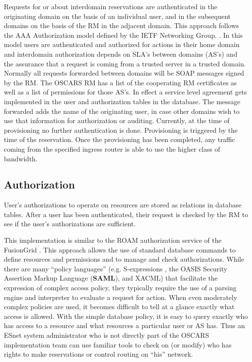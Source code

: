 \documentclass[conference]{IEEEtran}
\begin{document}
Requests for or about interdomain
reservations are authenticated in the originating domain on the basis
of an individual user, and in the subsequent domains on the basis of
the RM in the adjacent domain.  This approach follows the AAA  Authorization
model defined by the IETF Networking Group. \cite{AAA}. In this model
users are authenticated and authorized for actions in their home domain and 
interdomain authorization depends on SLA's between domains (AS's) and the
assurance that  a request is coming from a trusted server in a trusted 
domain. Normally all requests forwarded between domains will be SOAP messages
signed by the RM. The OSCARS RM has a list of the
cooperating RM certificates as well as a list of
permissions for those AS's. In effect a service level agreement gets
implemented in the user and authorization tables in the database. The message
forwarded adds the name of the originating user, in case other
domains wish to use that information for authorization or auditing.
Currently, at the time of provisioning no further authentication is
done. Provisioning is triggered by the time of the reservation. Once
the provisioning has been completed, any traffic coming from the
specified ingress router is able to use the higher class of bandwidth.

\subsection{Authorization}
User's authorizations to operate on resources are stored as relations
in database tables.  After a user has been authenticated, their request
is checked by the RM to see if the user's authorizations are sufficient.

This implementation is similar to the ROAM authorization service of the
FusionGrid \cite{burruss}.  This approach allows the use of standard database
commands to define resources and permissions and to manage and check
authorizations.
While there are many ``policy languages'' (e.g.
S-expressions \cite{S-expressions},
the OASIS Security Assertion Markup Language (\textbf{SAML}),
and XACML) that facilitate the 
expression of complex access policy, they
typically require the use of a parsing engine and interpreter to evaluate a 
request for action. When even moderately complex policies are used, it
becomes difficult to tell at a glance exactly what access is allowed. With the 
simple database policy, it is easy to query exactly who has access to a 
resource and what resources a particular user or AS  has. Thus an ESnet system 
administrator who is
not directly part of the OSCARS implementation team can use familiar tools to 
check on (or modify)
who has rights to make reservations or control routing on ``his'' network. 
\end{document}
